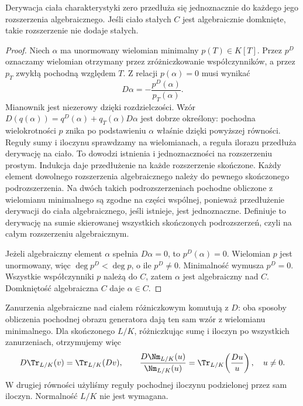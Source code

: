\begin{lemat}
Derywacja ciała charakterystyki zero przedłuża się jednoznacznie do każdego jego rozszerzenia algebraicznego. Jeśli ciało stałych $C$ jest algebraicznie domknięte, takie rozszerzenie nie dodaje stałych.
\end{lemat}
\begin{proof}
Niech $\alpha$ ma unormowany wielomian minimalny $p(T)\in K[T]$. Przez $p^D$ oznaczamy wielomian otrzymany przez zróżniczkowanie współczynników, a przez $p_T$ zwykłą pochodną względem $T$. Z relacji $p(\alpha)=0$ musi wynikać
\[
D\alpha=-\frac{p^D(\alpha)}{p_T(\alpha)}.
\]
Mianownik jest niezerowy dzięki rozdzielczości. Wzór $D(q(\alpha))=q^D(\alpha)+q_T(\alpha)D\alpha$ jest dobrze określony: pochodna wielokrotności $p$ znika po podstawieniu $\alpha$ właśnie dzięki powyższej równości. Reguły sumy i iloczynu sprawdzamy na wielomianach, a reguła ilorazu przedłuża derywację na ciało. To dowodzi istnienia i jednoznaczności na rozszerzeniu prostym. Indukcja daje przedłużenie na każde rozszerzenie skończone. Każdy element dowolnego rozszerzenia algebraicznego należy do pewnego skończonego podrozszerzenia. Na dwóch takich podrozszerzeniach pochodne obliczone z wielomianu minimalnego są zgodne na części wspólnej, ponieważ przedłużenie derywacji do ciała algebraicznego, jeśli istnieje, jest jednoznaczne. Definiuje to derywację na sumie skierowanej wszystkich skończonych podrozszerzeń, czyli na całym rozszerzeniu algebraicznym.

Jeżeli algebraiczny element $\alpha$ spełnia $D\alpha=0$, to $p^D(\alpha)=0$. Wielomian $p$ jest unormowany, więc $\deg p^D<\deg p$, o ile $p^D\ne0$. Minimalność wymusza $p^D=0$. Wszystkie współczynniki $p$ należą do $C$, zatem $\alpha$ jest algebraiczny nad $C$. Domkniętość algebraiczna $C$ daje $\alpha\in C$.
\end{proof}

Zanurzenia algebraiczne nad ciałem różniczkowym komutują z $D$: oba sposoby obliczenia pochodnej obrazu generatora dają ten sam wzór z wielomianu minimalnego. Dla skończonego $L/K$, różniczkując sumę i iloczyn po wszystkich zanurzeniach, otrzymujemy więc
\begin{equation}\label{eq:trace-norm}
D\Tr_{L/K}(v)=\Tr_{L/K}(Dv),\qquad
\frac{D\Nm_{L/K}(u)}{\Nm_{L/K}(u)}
=\Tr_{L/K}\!\left(\frac{Du}{u}\right),\quad u\ne0.
\end{equation}
W drugiej równości użyliśmy reguły pochodnej iloczynu podzielonej przez sam iloczyn. Normalność $L/K$ nie jest wymagana.

